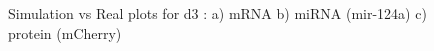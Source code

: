 \documentclass{article}
\begin{document}
\begin{figure}[h!]
\caption{Simulation vs Real plots for d3 : a) mRNA b) miRNA (mir-124a) c) protein (mCherry)}
\label{resultsd3}
\end{figure}

\begin{figure}[h!]
\centering
{}

\end{figure}
\end{document}
